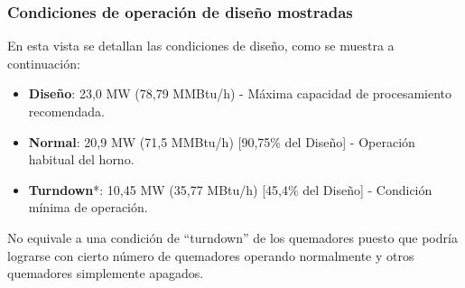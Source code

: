\subsubsection{Condiciones de operación de diseño mostradas}
\par En esta vista se detallan las condiciones de diseño, como se muestra a continuación:
\begin{itemize}
    \item \textbf{Diseño}: 23,0 MW (78,79 MMBtu/h) - Máxima capacidad de procesamiento recomendada.
    \item \textbf{Normal}: 20,9 MW (71,5 MMBtu/h) [90,75\% del Diseño] - Operación habitual del horno.
    \item \textbf{Turndown}*: 10,45 MW (35,77 MBtu/h) [45,4\% del Diseño] - Condición mínima de operación.
\end{itemize}
\par *No equivale a una condición de ``turndown'' de los quemadores puesto que podría lograrse con cierto número de quemadores operando normalmente y otros quemadores simplemente apagados.

